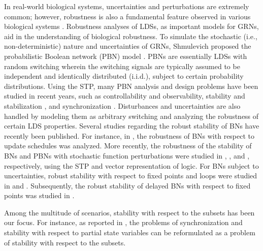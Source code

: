 \documentclass[11pt,onecolumn]{article}
\begin{document}
In real-world biological systems, uncertainties and perturbations are extremely common\cite{2007Stochastic,LEE2009927}; however, robustness is also a fundamental feature observed in various biological systems \cite{2004Biological}. Robustness analyses of LDSs, as important models for GRNs, aid in the understanding of biological robustness. To simulate the stochastic (i.e., non-deterministic) nature and uncertainties of GRNs, Shmulevich proposed the probabilistic Boolean network (PBN) model \cite{shmulevich2002probabilistic, shmulevich2002boolean,Shmulevich2010Probabilistic}. PBNs are essentially LDSs with random switching wherein the switching signals are typically assumed to be independent and identically distributed (i.i.d.), subject to certain probability distributions. Using the STP, many PBN analysis and design problems have been studied in recent years, such as controllability and observability\cite{Liu2015Controllability, Li2015Weak}, stability and stabilization \cite{Li2016State, Li2014State,  Li2014Partial, Chen2014Stability, Denic2009Robust, wu2016stochastic}, and synchronization \cite{Lu2015Synchronization, Chen2017Synchronization}.   Disturbances and uncertainties are also handled by modeling them as arbitrary switching and analyzing the robustness of certain LDS properties.
Several studies regarding the robust stability of BNs have recently been published. For instance, in \cite{ARACENA20091}, the robustness of BNs with respect to update schedules was analyzed. More recently, the robustness of the stability of BNs and PBNs with stochastic function perturbations were studied in \cite{2020Robustness}, \cite{Ren2021Robust}, and \cite{Li2022Robust}, respectively, using the STP and vector representation of logic. For BNs subject to uncertainties, robust stability with respect to fixed points and loops were studied in \cite{Li2017Robust} and \cite{2017Global}. Subsequently, the robust stability of delayed BNs with respect to fixed points was studied in \cite{2020Robust}.

Among the multitude of scenarios, stability with respect to the subsets has been our focus. For instance, as reported in \cite{Guo2015Set}, the problems of synchronization and stability with respect to partial state variables can be reformulated as a problem of stability with respect to the subsets.
\end{document}
